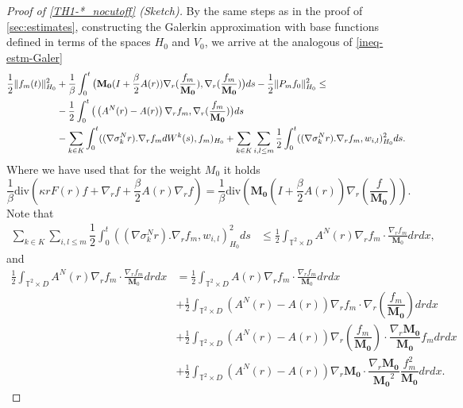 \documentclass[a4paper,12pt, reqno]{amsart}
\newcommand{\T}{\mathbb{T}}
\newcommand{\M}{\mathbf{M}}
\renewcommand{\k}{\kappa}
\newcommand{\Div}{\text{div}}
\begin{document}
         \begin{proof}[Proof of \autoref{TH1-*_nocutoff} (Sketch)]
             By the same steps as in the proof of \autoref{sec:estimates}, constructing the Galerkin approximation with base functions defined  in terms of the spaces $H_0$ and $V_0$, we arrive at the analogous of \eqref{ineq-estm-Galer}
             \begin{align}
   \dfrac{1}{2} \Vert f_m(t)\Vert_{H_0}^2&+\dfrac{1}{\beta}\int_0^t\big(\mathbf{M_0}(I+ \frac{\beta}{2}A(r))\nabla_r(\dfrac{f_m}{\mathbf{M_0}}),\nabla_r(\dfrac{f_m}{\mathbf{M_0}})\big)ds-\dfrac{1}{2}\Vert P_mf_{0}\Vert_{H_0}^2\le\notag\\
  &- \dfrac{1}{2}\int_0^t\big(\left(A^N(r)- A(r)\right) \nabla_rf_m,\nabla_r(\dfrac{f_m}{\mathbf{M_0}})\big)ds\label{ineq-estm-Galer_nocutoff}\\
            & -\sum_{k\in K}\int_0^t((\nabla \sigma_k^Nr).\nabla_rf_m dW^k(s),f_m)_{H_0}+ \sum_{k\in K}\sum_{i,l \le m}\dfrac{1}{2}\int_0^t((\nabla \sigma_k^Nr).\nabla_rf_m,w_{i,l})_{H_0}^2 ds.\notag
\end{align}
Where we have used that for the weight $M_0$ it holds 
$$\frac{1}{\beta}\Div\left(\k rF(r)f + \nabla_r f + \frac{\beta}{2}A(r)\nabla_r f\right) = \frac{1}{\beta}\Div\left(\mathbf{M_0}(I+ \frac{\beta}{2}A(r))\nabla_r(\dfrac{f}{\mathbf{M_0}})\right).$$
Note that
\begin{align*} \sum_{k\in K}\sum_{i,l \le m}\dfrac{1}{2}\int_0^t((\nabla \sigma_k^Nr).\nabla_rf_m,w_{i,l})_{H_0}^2 ds 
&\leq  \frac{1}{2}\int_{\T^2 \times D} A^N(r) \nabla_r f_m \cdot \frac{\nabla_r f_m}{\M_0}drdx,
\end{align*}
and 
\begin{align*}
    \frac{1}{2}\int_{\T^2 \times D} A^N(r) \nabla_r f_m \cdot \frac{\nabla_r f_m}{\M_0}drdx&=\frac{1}{2}\int_{\T^2 \times D} A(r) \nabla_r f_m \cdot \frac{\nabla_r f_m}{\M_0}drdx\\&+\frac{1}{2}\int_{\T^2 \times D} (A^N(r)-A(r)) \nabla_r f_m \cdot \nabla_r(\dfrac{f_m}{\mathbf{M_0}})drdx\\
    &+\frac{1}{2}\int_{\T^2 \times D} (A^N(r)-A(r)) \nabla_r(\dfrac{f_m}{\mathbf{M_0}}) \cdot  \dfrac{\nabla_r\mathbf{M_0}}{\mathbf{M_0}}f_mdrdx\\
    &+\frac{1}{2}\int_{\T^2 \times D} (A^N(r)-A(r)) \nabla_r\mathbf{M_0} \cdot  \dfrac{\nabla_r\mathbf{M_0}}{\mathbf{M_0}^2}\dfrac{f_m^2}{\mathbf{M_0}}drdx.

\end{align*}
\end{proof}
\end{document}
